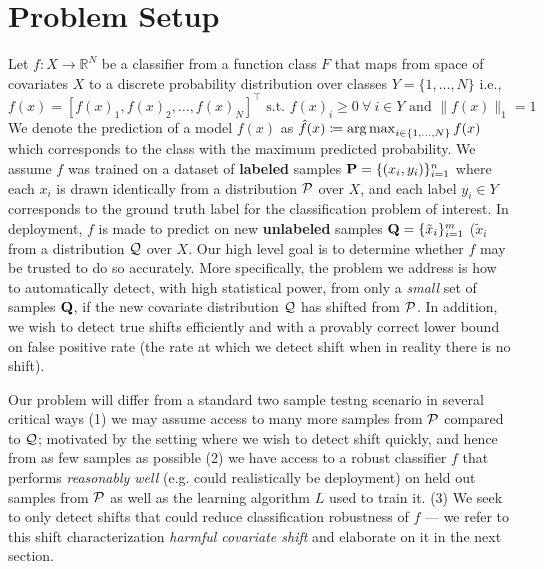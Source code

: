 \section{Problem Setup}\label{sec:problem-setup}
Let $f: X\to \mathbb{R}^N $ be a classifier from a function class $F$ that maps from space of covariates $X$ to a discrete probability distribution over classes $Y=\{1,\ldots,N\}$ i.e.,
\[f(x)=[f(x)_1, f(x)_2, \ldots, f(x)_N]^\top\text{ s.t. }f(x)_i \geq 0\ \forall\ i\in Y \text{ and } \|f(x)\|_1 = 1\]
We denote the prediction of a model $f(x)$ as $\hat{f}(x)\coloneq \operatorname*{arg\,max}_{i\in \{1,\dots,N\} }f(x)$ which corresponds to the class with the maximum predicted probability.
We assume $f$ was trained on a dataset of \textbf{labeled} samples $\mathbf{P} = \{(x_i,y_i)\}_{i=1}^n$ where each $x_i$ is drawn identically from a distribution $\mathcal{P}$ over $X$, and
each label $y_i \in Y$ corresponds to the ground truth label for the classification problem of interest.
In deployment, $f$ is made to predict on new \textbf{unlabeled} samples $\mathbf{Q} = \{\tilde{x}_i\}_{i=1}^m$ ($\tilde{x}_i$ from a distribution $\mathcal{Q}$ over $X$.
Our high level goal is to determine whether $f$ may be trusted to do so accurately.
More specifically, the problem we address is how to automatically detect, with high statistical power, from only a \textit{small} set of samples $\mathbf{Q}$,
if the new covariate distribution $\mathcal{Q}$ has shifted from $\mathcal{P}$.
In addition, we wish to detect true shifts efficiently and with a provably correct lower bound on false positive rate (the rate at which we detect shift when in reality there is no shift).

Our problem will differ from a standard two sample testng scenario in several critical ways (1) we may assume access to many more samples from $\mathcal{P}$
compared to $\mathcal{Q}$; motivated by the setting where we wish to detect shift quickly, and hence from as few samples as possible
(2) we have access to a robust classifier $f$ that performs \textit{reasonably well} (e.g. could realistically be deployment) on held out samples from $\mathcal{P}$ as well as the learning algorithm $L$ used to train it.
(3) We seek to only detect shifts that could reduce classification robustness of $f$ --- we refer to this shift characterization \textit{harmful covariate shift} and elaborate on it in the next section.

\clearpage
